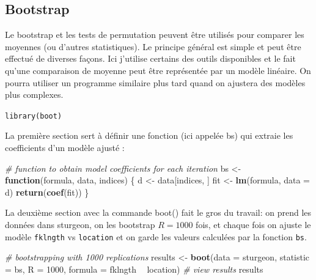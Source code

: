 \documentclass[12pt,]{book}
\newenvironment{Shaded}{\begin{snugshade}}{\end{snugshade}}
\newcommand{\CommentTok}[1]{\textcolor[rgb]{0.56,0.35,0.01}{\textit{#1}}}
\newcommand{\ControlFlowTok}[1]{\textcolor[rgb]{0.13,0.29,0.53}{\textbf{#1}}}
\newcommand{\DataTypeTok}[1]{\textcolor[rgb]{0.13,0.29,0.53}{#1}}
\newcommand{\DecValTok}[1]{\textcolor[rgb]{0.00,0.00,0.81}{#1}}
\newcommand{\KeywordTok}[1]{\textcolor[rgb]{0.13,0.29,0.53}{\textbf{#1}}}
\newcommand{\NormalTok}[1]{#1}
\newcommand{\OperatorTok}[1]{\textcolor[rgb]{0.81,0.36,0.00}{\textbf{#1}}}
\newcommand{\StringTok}[1]{\textcolor[rgb]{0.31,0.60,0.02}{#1}}
\begin{document}
\hypertarget{bootstrap}{%
\subsection{Bootstrap}\label{bootstrap}}

Le bootstrap et les tests de permutation peuvent être utilisés pour comparer les moyennes (ou d'autres statistiques). Le principe général est simple et peut être effectué de diverses façons. Ici j'utilise certains des outils disponibles et le fait qu'une comparaison de moyenne peut être représentée par un modèle linéaire. On pourra utiliser un programme similaire plus tard quand on ajustera des modèles plus complexes.

\texttt{library(boot)}

La première section sert à définir une fonction (ici appelée bs) qui extraie les coefficients d'un modèle ajusté :

\begin{Shaded}
\begin{Highlighting}[]
\CommentTok{# function to obtain model coefficients for each iteration}
\NormalTok{bs <-}\StringTok{ }\ControlFlowTok{function}\NormalTok{(formula, data, indices) \{}
\NormalTok{  d <-}\StringTok{ }\NormalTok{data[indices, ]}
\NormalTok{  fit <-}\StringTok{ }\KeywordTok{lm}\NormalTok{(formula, }\DataTypeTok{data =}\NormalTok{ d)}
  \KeywordTok{return}\NormalTok{(}\KeywordTok{coef}\NormalTok{(fit))}
\NormalTok{\}}
\end{Highlighting}
\end{Shaded}

La deuxième section avec la commande boot() fait le gros du travail: on prend les données dans sturgeon, on les bootstrap \(R = 1000\) fois, et chaque fois on ajuste le modèle \texttt{fklngth} vs \texttt{location} et on garde les valeurs calculées par la fonction \texttt{bs}.

\begin{Shaded}
\begin{Highlighting}[]
\CommentTok{# bootstrapping with 1000 replications}
\NormalTok{results <-}\StringTok{ }\KeywordTok{boot}\NormalTok{(}\DataTypeTok{data =}\NormalTok{ sturgeon, }\DataTypeTok{statistic =}\NormalTok{ bs, }\DataTypeTok{R =} \DecValTok{1000}\NormalTok{,}
\DataTypeTok{formula =}\NormalTok{ fklngth }\OperatorTok{~}\StringTok{ }\NormalTok{location)}
\CommentTok{# view results}
\NormalTok{results}
\end{Highlighting}
\end{Shaded}
\end{document}
